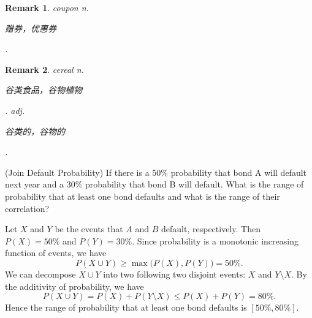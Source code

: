 \documentclass[12pt,letterpaper, onecolumn]{exam}
\newtheorem{remark}{Remark}
\begin{document}
\begin{questions}
\begin{solution}
        \end{solution}
        \begin{remark}
            coupon  n. \begin{CJK}{UTF8}{gbsn}赠券，优惠券\end{CJK}.
        \end{remark}
        \begin{remark}
            cereal  n. \begin{CJK}{UTF8}{gbsn}谷类食品，谷物植物\end{CJK}. adj. \begin{CJK}{UTF8}{gbsn}谷类的，谷物的\end{CJK}.
        \end{remark}
        \question[](Join Default Probability) If there is a 50\% probability that bond A will default next year and a 30\% probability that bond B will default. What is the range of probability that at least one bond defaults and what is the range of their correlation?
        \begin{solution}
            Let $X$ and $Y$ be the events that $A$ and $B$ default, respectively. Then $P(X)=50\%$ and $P(Y)=30\%$. Since probability is a monotonic increasing function of events, we have
            $$P(X\cup Y)\ge\max\big(P(X),P(Y)\big)=50\%.$$
            We can decompose $X\cup Y$ into two following two disjoint events: $X$ and $Y\setminus X$. By the additivity of probability, we have 
            $$P(X\cup Y)=P(X)+P(Y\setminus X)\le P(X)+P(Y)=80\%.$$
            Hence the range of probability that at least one bond defaults is $[50\%,80\%]$.


\end{solution}
\end{questions}
\end{document}

